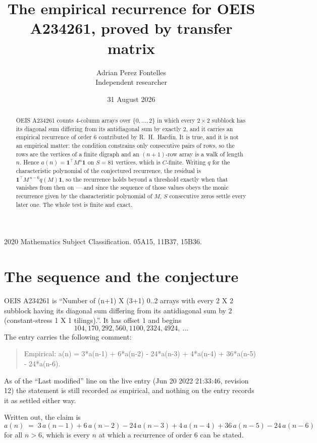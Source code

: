 \documentclass[11pt,a4paper]{article}
\title{The empirical recurrence for OEIS A234261, proved by transfer matrix}
\author{Adrian Perez Fontelles\\ \small Independent researcher}
\date{31 August 2026}
\theoremstyle{plain}
\theoremstyle{definition}
\begin{document}
\maketitle

\begin{abstract}
OEIS A234261 counts $4$-column arrays over $\{0,\dots,2\}$ in which every
$2\times2$ subblock has its diagonal sum differing from its antidiagonal sum by
exactly $2$, and it
carries an empirical recurrence of order $6$ contributed by R.~H.~Hardin. It is true,
and it is not an empirical matter: the condition constrains only consecutive pairs of rows,
so the rows are the vertices of a finite digraph and an $(n+1)$-row array is a walk of
length $n$. Hence $a(n)=\mathbf{1}^{\!\top}M^{n}\mathbf{1}$ on $S=81$ vertices, which
is $C$-finite. Writing $q$ for the characteristic polynomial of the conjectured recurrence,
the residual is $\mathbf{1}^{\!\top}M^{\,n-6}q(M)\mathbf{1}$, so the recurrence
holds beyond a threshold exactly when that vanishes from then on --- and since the sequence
of those values obeys the monic recurrence given by the characteristic polynomial of $M$,
$S$ consecutive zeros settle every later one. The whole test is finite and exact.
\end{abstract}

\noindent\small 2020 Mathematics Subject Classification. 05A15, 11B37, 15B36.\normalsize

\section{The sequence and the conjecture}

OEIS A234261 is ``Number of (n+1) X (3+1) 0..2 arrays with every 2 X 2 subblock having its diagonal sum differing from its antidiagonal sum by 2 (constant-stress 1 X 1 tilings).''. It has offset
$1$ and begins
\[
104, 170, 292, 560, 1100, 2324, 4924,\ \dots
\]
The entry carries the following comment:
\begin{quote}\small
Empirical: a(n) = 3*a(n-1) + 6*a(n-2) - 24*a(n-3) + 4*a(n-4) + 36*a(n-5) - 24*a(n-6).
\end{quote}
As of the ``Last modified'' line on the live entry (Jun 20 2022 21:33:46, revision 12) the statement is
still recorded as empirical, and nothing on the entry records it as settled either way.

Written out, the claim is
\begin{equation}\label{eq:conj}
a(n)\;=\;3\,a(n-1) + 6\,a(n-2) - 24\,a(n-3) + 4\,a(n-4) + 36\,a(n-5) - 24\,a(n-6)
\end{equation}
for all $n>6$, which is every $n$ at which a recurrence of order $6$ can be
stated.
\end{document}
